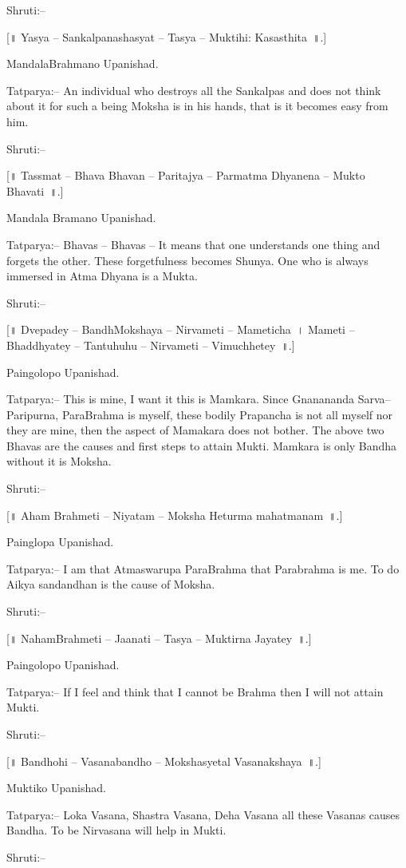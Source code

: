 Shruti:–

[॥ Yasya – Sankalpanashasyat – Tasya – Muktihi: Kasasthita~॥.]

MandalaBrahmano Upanishad.

Tatparya:– An individual who destroys all the Sankalpas and does not think about it for such a being Moksha is in his hands, that is it becomes easy from him.

Shruti:–

[॥ Tassmat – Bhava Bhavan – Paritajya – Parmatma Dhyanena – Mukto Bhavati~॥.]

Mandala Bramano Upanishad.

Tatparya:– Bhavas – Bhavas – It means that one understands one thing and forgets the other. These forgetfulness becomes Shunya. One who is always immersed in Atma Dhyana is a Mukta.

Shruti:–

[॥ Dvepadey – BandhMokshaya – Nirvameti – Mameticha~। Mameti – Bhaddhyatey – Tantuhuhu – Nirvameti – Vimuchhetey~॥.]

Paingolopo Upanishad.

Tatparya:– This is mine, I want it this is Mamkara. Since Gnanananda Sarva–Paripurna, ParaBrahma is myself, these bodily Prapancha is not all myself nor they are mine, then the aspect of Mamakara does not bother. The above two Bhavas are the causes and first steps to attain Mukti. Mamkara is only Bandha without it is Moksha.

Shruti:–

[॥ Aham Brahmeti – Niyatam – Moksha Heturma mahatmanam~॥.]

Painglopa Upanishad.

Tatparya:– I am that Atmaswarupa ParaBrahma that Parabrahma is me. To do Aikya sandandhan is the cause of Moksha.

Shruti:–

[॥ NahamBrahmeti – Jaanati – Tasya – Muktirna Jayatey~॥.]

Paingolopo Upanishad.

Tatparya:– If I feel and think that I cannot be Brahma then I will not attain Mukti.

Shruti:–

[॥ Bandhohi – Vasanabandho – Mokshasyetal Vasanakshaya~॥.]

Muktiko Upanishad.

Tatparya:– Loka Vasana, Shastra Vasana, Deha Vasana all these Vasanas causes Bandha. To be Nirvasana will help in Mukti.

Shruti:–


